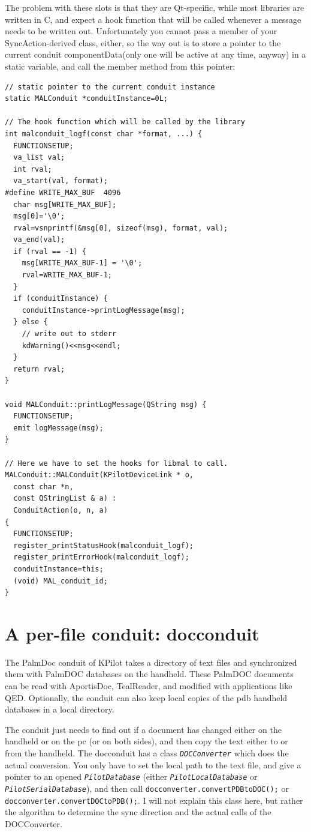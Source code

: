 \documentclass[10pt,a4paper]{article}
\newcommand{\code}[1]{{\small\texttt{#1}}}
\newcommand{\class}[1]{{\small\em\texttt{#1}}}
\begin{document}
The problem with these slots is that they are Qt-specific, while most libraries are written in C, and expect a hook function that will be called whenever a message needs to be written out. Unfortunately you cannot pass a member of your SyncAction-derived class, either, so the way out is to store a pointer to the current conduit componentData(only one will be active at any time, anyway) in a static variable, and call the member method from this pointer:

{\footnotesize
\begin{verbatim}
// static pointer to the current conduit instance
static MALConduit *conduitInstance=0L;

// The hook function which will be called by the library
int malconduit_logf(const char *format, ...) {
  FUNCTIONSETUP;
  va_list val;
  int rval;
  va_start(val, format);
#define WRITE_MAX_BUF  4096
  char msg[WRITE_MAX_BUF];
  msg[0]='\0';
  rval=vsnprintf(&msg[0], sizeof(msg), format, val);
  va_end(val);
  if (rval == -1) {
    msg[WRITE_MAX_BUF-1] = '\0';
    rval=WRITE_MAX_BUF-1;
  }
  if (conduitInstance) {
    conduitInstance->printLogMessage(msg);
  } else {
    // write out to stderr
    kdWarning()<<msg<<endl;
  }
  return rval;
}

void MALConduit::printLogMessage(QString msg) {
  FUNCTIONSETUP;
  emit logMessage(msg);
}

// Here we have to set the hooks for libmal to call.
MALConduit::MALConduit(KPilotDeviceLink * o,
  const char *n, 
  const QStringList & a) :
  ConduitAction(o, n, a)
{
  FUNCTIONSETUP;
  register_printStatusHook(malconduit_logf);
  register_printErrorHook(malconduit_logf);
  conduitInstance=this;
  (void) MAL_conduit_id;
}
\end{verbatim}
}



\section{A per-file conduit: docconduit}\label{SectionDatabasesConduit}

The PalmDoc conduit of KPilot takes a directory of text files and synchronized them with PalmDOC databases on the handheld. These PalmDOC documents can be read with AportisDoc, TealReader, and modified with applications like QED. Optionally, the conduit can also keep local copies of the pdb handheld databases in a local directory.

The conduit just needs to find out if a document has changed either on the handheld or on the pc (or on both sides), and then copy the text either to or from the handheld. The docconduit has a class \class{DOCConverter} which does the actual conversion. You only have to set the local path to the text file, and give a pointer to an opened \class{PilotDatabase} (either \class{PilotLocalDatabase} or \class{PilotSerialDatabase}), and then call 
\code{docconverter.convertPDBtoDOC();} or \code{docconverter.convertDOCtoPDB();}. I will not explain this class here, but rather the algorithm to determine the sync direction and the actual calls of the DOCConverter. 
\end{document}
